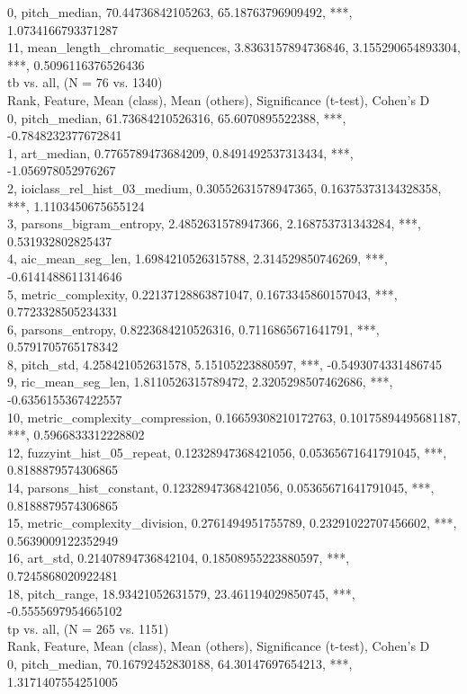 0, pitch_median, 70.44736842105263, 65.18763796909492, ***, 1.0734166793371287\\
11, mean_length_chromatic_sequences, 3.8363157894736846, 3.155290654893304, ***, 0.5096116376526436\\
tb vs. all, (N = 76 vs. 1340)\\
Rank, Feature, Mean (class), Mean (others), Significance (t-test), Cohen's D\\
0, pitch_median, 61.73684210526316, 65.6070895522388, ***, -0.7848232377672841\\
1, art_median, 0.7765789473684209, 0.8491492537313434, ***, -1.056978052976267\\
2, ioiclass_rel_hist_03_medium, 0.30552631578947365, 0.16375373134328358, ***, 1.1103450675655124\\
3, parsons_bigram_entropy, 2.4852631578947366, 2.168753731343284, ***, 0.531932802825437\\
4, aic_mean_seg_len, 1.6984210526315788, 2.314529850746269, ***, -0.6141488611314646\\
5, metric_complexity, 0.22137128863871047, 0.1673345860157043, ***, 0.7723328505234331\\
6, parsons_entropy, 0.8223684210526316, 0.7116865671641791, ***, 0.5791705765178342\\
8, pitch_std, 4.258421052631578, 5.15105223880597, ***, -0.5493074331486745\\
9, ric_mean_seg_len, 1.8110526315789472, 2.3205298507462686, ***, -0.6356155367422557\\
10, metric_complexity_compression, 0.16659308210172763, 0.10175894495681187, ***, 0.5966833312228802\\
12, fuzzyint_hist_05_repeat, 0.12328947368421056, 0.05365671641791045, ***, 0.8188879574306865\\
14, parsons_hist_constant, 0.12328947368421056, 0.05365671641791045, ***, 0.8188879574306865\\
15, metric_complexity_division, 0.2761494951755789, 0.23291022707456602, ***, 0.5639009122352949\\
16, art_std, 0.21407894736842104, 0.18508955223880597, ***, 0.7245868020922481\\
18, pitch_range, 18.93421052631579, 23.461194029850745, ***, -0.5555697954665102\\
tp vs. all, (N = 265 vs. 1151)\\
Rank, Feature, Mean (class), Mean (others), Significance (t-test), Cohen's D\\
0, pitch_median, 70.16792452830188, 64.30147697654213, ***, 1.3171407554251005\\
